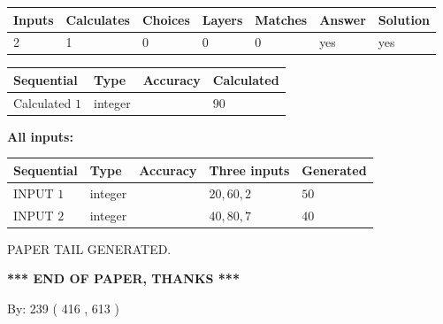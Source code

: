 \documentclass{ctexart}
\begin{document}
   
\noindent\begin{tabular}{|l|l|l|l|l|l|l|}
 \hline
Inputs & Calculates & Choices & Layers & Matches & Answer & Solution \\ \hline
 2  & 
 1  & 
 0
  & 
 0  & 
 0  & 
  yes & 
  yes 
  \\ \hline
 \end{tabular}
   
   
   
   
\noindent{}
   
   
  
  
\noindent\begin{tabular}{|l|l|l|l|}
\hline
 Sequential & Type & Accuracy & Calculated \\ 
\hline
 
 
  Calculated $  1 $ & integer &  & 
  $ 90 $ 
 \\  \hline  
 \end{tabular}
   
   
   
   
\noindent\vspace{0.1in}\hspace{-0.08in} {\textbf{\Large{All inputs: }}}
   
   
  
  
\noindent\begin{tabular}{|l|l|l|l|l|}
\hline
 Sequential & Type & Accuracy & Three inputs & Generated \\ 
\hline
 
 
  INPUT $  1 $ & integer &  & $
 20
 , 
 60
 , 
 2
 $ & $ 50 $ 
 \\  \hline  
 
 
  INPUT $  2 $ & integer &  & $
 40
 , 
 80
 , 
 7
 $ & $ 40 $ 
 \\  \hline  
 \end{tabular}
   
   
   
   
   
   
 \vspace{0.2in}
 
   
   
\vspace{2.0in} PAPER TAIL GENERATED.
   
   
   
   
\vspace{1.0in} 
{\textbf{\large{ *** END OF PAPER, THANKS *** }}} 
   
   
\hspace{1.0in} By: 
 239 ( 416 ,  613 )
   
\end{document}
